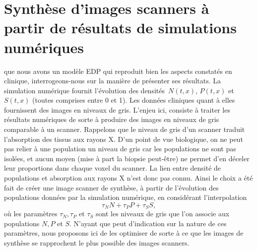 \documentclass[main.tex]{subfiles}
\begin{document}
\chapter{Synthèse d'images scanners à partir de résultats de simulations numériques \label{chap:optim_grey}}


 que nous avons un modèle EDP qui reproduit bien les aspects constatés en clinique, interrogeons-nous sur la manière de présenter ses résultats. La simulation numérique fournit  l'évolution des densités~$N(t,x)$, $P(t,x)$ et~$S(t,x)$ (toutes comprises entre 0 et 1). 
Les données cliniques quant à elles fournissent des images en niveaux de gris. 
L'enjeu ici, consiste à traiter les résultats numériques de sorte à produire des images en niveaux de gris comparable à un scanner. 
Rappelons que le niveau de gris d'un scanner traduit l'absorption des tissus aux rayons X. D'un point de vue biologique, on ne peut pas relier à une population un niveau de gris car les populations ne sont pas isolées, et aucun moyen (mise à part la biopsie peut-être) ne permet d'en déceler leur proportions dans chaque voxel du scanner. La lien entre densité de populations et absorption aux rayons X n'est donc pas connu. Ainsi le choix a été fait de créer une image scanner de synthèse, à partir de l'évolution des populations données par la simulation numérique, en considérant l'interpolation 
\begin{equation}\label{eq:nvx_gris}
\tau_N N + \tau_P P + \tau_S S,
\end{equation}
où les paramètres $\tau_N, \tau_P$ et $\tau_S$ sont les niveaux de gris que l'on associe aux populations $N,P$ et $S$. N'ayant que peut d'indication sur la nature de ces paramètres, nous proposons ici de les optimiser de sorte à ce que les images de synthèse se rapprochent le plus possible des images scanners. 
\end{document}
